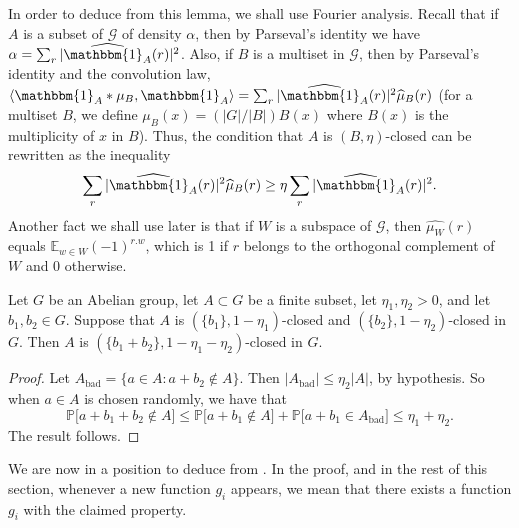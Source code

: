 \documentclass{toc}
\newcommand\E{\mathbb{E}}
\renewcommand\a{\alpha}
\newcommand{\ind}{\mathbbm{1}}
\renewcommand\AA{\ind_A}
\newcommand \cG{\mathcal G}
\begin{document}
In order to deduce  from this lemma, we shall use Fourier analysis. Recall that if $A$ is a subset of $\cG$ of density $\a$, then by Parseval's identity we have $\a=\sum_r|\widehat{\AA}(r)|^2$. Also, if $B$ is a multiset in $\cG$, then by Parseval's identity and the convolution law, $\langle \AA*\mu_B,\AA\rangle=\sum_r|\widehat{\AA}(r)|^2\widehat\mu_B(r)$ (for a multiset $B$, we define $\mu_B(x)= ({|G|}/{|B|}) B(x)$ where $B(x)$ is the multiplicity of $x$ in $B$). Thus, the condition that $A$ is $(B,\eta)$-closed can be rewritten as the inequality 
\[\sum_r|\widehat{\AA}(r)|^2\widehat\mu_B(r)\geq\eta\sum_r|\widehat{\AA}(r)|^2.\]
Another fact we shall use later is that if $W$ is a subspace of $\cG$, then $\widehat{\mu_W}(r)$ equals $\E_{w\in W}(-1)^{r.w}$, which is 1 if $r$ belongs to the orthogonal complement of $W$ and 0 otherwise.

\begin{lemma}\label{triangle}
	Let $G$ be an Abelian group, let $A\subset G$ be a finite subset, let $\eta_1,\eta_2>0$, and let $b_1,b_2\in G$. Suppose that $A$ is $(\{b_1\},1-\eta_1)$-closed and $(\{b_2\},1-\eta_2)$-closed in $G$. Then $A$ is $(\{b_1+b_2\},1-\eta_1-\eta_2)$-closed in $G$.
\end{lemma}

\begin{proof}
	Let $A_{\text{bad}}=\{a\in A: a+b_2\not \in A\}$. Then $|A_{\text{bad}}|\leq \eta_2|A|$, by hypothesis. So when $a\in A$ is chosen randomly, we have that 
	\[\mathbb{P}\lbrack a+b_1+b_2\not \in A \rbrack \leq \mathbb{P}\lbrack a+b_1\not\in A\rbrack+\mathbb{P}\lbrack a+b_1\in A_{\text{bad}}\rbrack\leq \eta_1+\eta_2.\]
	The result follows.
\end{proof}

We are now in a position to deduce  from . In the proof, and in the rest of this section, whenever a new function $g_i$ appears, we mean that there exists a function $g_i$ with the claimed property.
\end{document}
